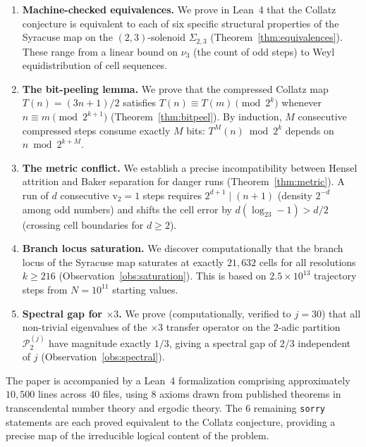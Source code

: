 \documentclass{CUP-JNL-FMP}%
\theoremstyle{definition}
\numberwithin{equation}{section}
\newcommand{\val}{\mathrm{v}_2}
\newcommand{\logb}{\log_2}
\begin{document}
\begin{enumerate}
  \item \textbf{Machine-checked equivalences.} We prove in Lean~4 that the Collatz
    conjecture is equivalent to each of six specific structural properties of the
    Syracuse map on the $(2,3)$-solenoid $\Sigma_{2,3}$ (Theorem~\ref{thm:equivalences}).
    These range from a linear bound on $\nu_3$ (the count of odd steps) to Weyl
    equidistribution of cell sequences.

  \item \textbf{The bit-peeling lemma.} We prove that the compressed Collatz map
    $T(n) = (3n+1)/2$ satisfies $T(n) \equiv T(m) \pmod{2^k}$ whenever
    $n \equiv m \pmod{2^{k+1}}$ (Theorem~\ref{thm:bitpeel}). By induction, $M$
    consecutive compressed steps consume exactly $M$ bits: $T^M(n) \bmod 2^k$
    depends on $n \bmod 2^{k+M}$.

  \item \textbf{The metric conflict.} We establish a precise incompatibility between
    Hensel attrition and Baker separation for danger runs (Theorem~\ref{thm:metric}).
    A run of $d$ consecutive $\val = 1$ steps requires $2^{d+1} \mid (n+1)$ (density
    $2^{-d}$ among odd numbers) and shifts the cell error by $d(\logb 3 - 1) > d/2$
    (crossing cell boundaries for $d \geq 2$).

  \item \textbf{Branch locus saturation.} We discover computationally that the
    branch locus of the Syracuse map saturates at exactly $21{,}632$ cells for
    all resolutions $k \geq 216$ (Observation~\ref{obs:saturation}). This is based
    on $2.5 \times 10^{13}$ trajectory steps from $N = 10^{11}$ starting values.

  \item \textbf{Spectral gap for $\times 3$.} We prove (computationally, verified
    to $j = 30$) that all non-trivial eigenvalues of the $\times 3$ transfer
    operator on the $2$-adic partition $\mathcal{P}_2^{(j)}$ have magnitude exactly
    $1/3$, giving a spectral gap of $2/3$ independent of $j$
    (Observation~\ref{obs:spectral}).
\end{enumerate}

The paper is accompanied by a Lean~4 formalization comprising approximately
$10{,}500$ lines across $40$ files, using $8$ axioms drawn from published
theorems in transcendental number theory and ergodic theory. The $6$ remaining
\texttt{sorry} statements are each proved equivalent to the Collatz conjecture,
providing a precise map of the irreducible logical content of the problem.
\end{document}
